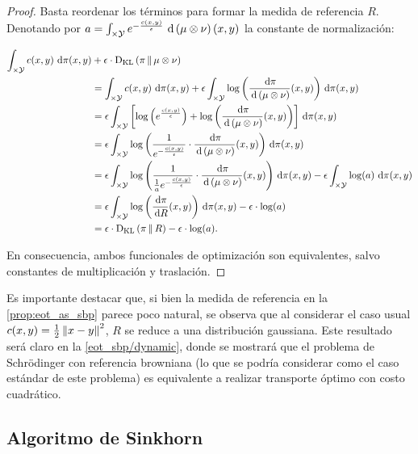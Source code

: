 \begin{proof}

	Basta reordenar los términos para formar la medida de referencia $R$. Denotando por $a=\int_{\times\mathcal{Y}} e^{-\frac{c(x,y)}{\epsilon}}\,\operatorname{d}\!\,\left(\mu\otimes\nu\right)(x,y)$ la constante de normalización:

	\begin{align*}
		\int_{\xspace\times\yspace} c(x,y) \d\pi(x,y) &+ \epsilon\cdot\KL{\pi}{\mu\otimes\nu}\\
		&= \int_{\xspace\times\yspace} c(x,y) \d\pi(x,y) + \epsilon \int_{\xspace\times\yspace} \log\parent{\frac{\d\pi}{\d\,\parent{\mu\otimes\nu}}(x,y)} \d\pi(x,y)\\
		&= \epsilon \int_{\xspace\times\yspace} \rparent{\log\parent{e^{\frac{c(x,y)}{\epsilon}}} + \log\parent{\frac{\d\pi}{\d\,\parent{\mu\otimes\nu}}(x,y)}} \d\pi(x,y)\\
		&= \epsilon \int_{\xspace\times\yspace} \log\parent{\frac{1}{e^{-\frac{c(x,y)}{\epsilon}}}\cdot\frac{\d\pi}{\d\,\parent{\mu\otimes\nu}}(x,y)} \d\pi(x,y)\\
		&= \epsilon \int_{\xspace\times\yspace} \log\parent{\frac{1}{\frac{1}{a}e^{-\frac{c(x,y)}{\epsilon}}}\cdot\frac{\d\pi}{\d\,\parent{\mu\otimes\nu}}(x,y)}\d\pi(x,y) - \epsilon\int_{\xspace\times\yspace} \log(a) \d\pi(x,y)\\
		&=\epsilon\int_{\xspace\times\yspace}\log\parent{\frac{\d\pi}{\d R}(x,y)}\d\pi(x,y)- \epsilon\cdot\log(a)\\
		&= \epsilon\cdot \KL{\pi}{R} - \epsilon\cdot\log(a).
	\end{align*}

	En consecuencia, ambos funcionales de optimización son equivalentes, salvo constantes de multiplicación y traslación.
	
\end{proof}

Es importante destacar que, si bien la medida de referencia en la \autoref{prop:eot_as_sbp} parece poco natural, se observa que al considerar el caso usual $c(x,y)=\frac{1}{2}\left\lVert x-y \right\rVert^2$, $R$ se reduce a una distribución gaussiana. Este resultado será claro en la \autoref{eot_sbp/dynamic}, donde se mostrará que el problema de Schrödinger con referencia browniana (lo que se podría considerar como el caso estándar de este problema) es equivalente a realizar transporte óptimo con costo cuadrático.

\subsection{Algoritmo de Sinkhorn}
\label{eot_sbp/static_sbp/sinkhorn}

